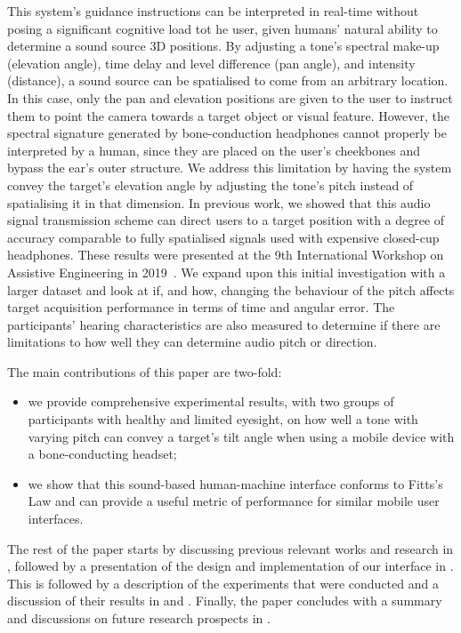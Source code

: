 \documentclass[acmsmall]{acmart}
\begin{document}
This system's guidance instructions can be interpreted in real-time without posing a significant cognitive load tot he user, given humans' natural ability to determine a sound source 3D positions.
By adjusting a tone's spectral make-up (elevation angle), time delay and level difference (pan angle), and intensity (distance), a sound source can be spatialised to come from an arbitrary location.
In this case, only the pan and elevation positions are given to the user to instruct them to point the camera towards a target object or visual feature.
However, the spectral signature generated by bone-conduction headphones cannot properly be interpreted by a human, since they are placed on the user's cheekbones and bypass the ear's outer structure.
We address this limitation by having the system convey the target's elevation angle by adjusting the tone's pitch instead of spatialising it in that dimension.
In previous work, we showed that this audio signal transmission scheme can direct users to a target position with a degree of accuracy comparable to fully spatialised signals used with expensive closed-cup headphones.
These results were presented at the 9th International Workshop on Assistive Engineering in 2019~\citep{lock2019bone}.
We expand upon this initial investigation with a larger dataset and look at if, and how, changing the behaviour of the pitch affects target acquisition performance in terms of time and angular error.
The participants' hearing characteristics are also measured to determine if there are limitations to how well they can determine audio pitch or direction. 

The main contributions of this paper are two-fold: 
\begin{itemize}
  \item we provide comprehensive experimental results, with two groups of participants with healthy and limited eyesight, on how well a tone with varying pitch can convey a target's tilt angle when using a mobile device with a bone-conducting headset; 
  \item we show that this sound-based human-machine interface conforms to Fitts's Law and can provide a useful metric of performance for similar mobile user interfaces.
\end{itemize}

The rest of the paper starts by discussing previous relevant works and research in , followed by a presentation of the design and implementation of our interface in .
This is followed by a description of the experiments that were conducted and a discussion of their results in  and .
Finally, the paper concludes with a summary and discussions on future research prospects in .
\end{document}
